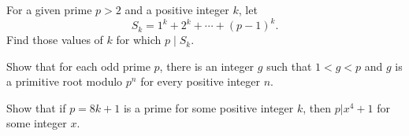 \documentclass{subfile}
\begin{document}
	\begin{problem}
		For a given prime $p > 2$ and a positive integer $k$, let \[ S_k = 1^k + 2^k + \cdots + (p - 1)^k.\] Find those values of $k$ for which $p \mid S_k$. %
	\end{problem}


	\begin{problem}
		Show that for each odd prime $p$, there is an integer $g$ such that $1<g<p$ and $g$ is a primitive root modulo $p^n$ for every positive integer $n$. %
	\end{problem}


	\begin{problem}
		Show that if $p=8k+1$ is a prime for some positive integer $k$, then $p|x^4+1$ for some integer $x$. %
	\end{problem}
\end{document}
